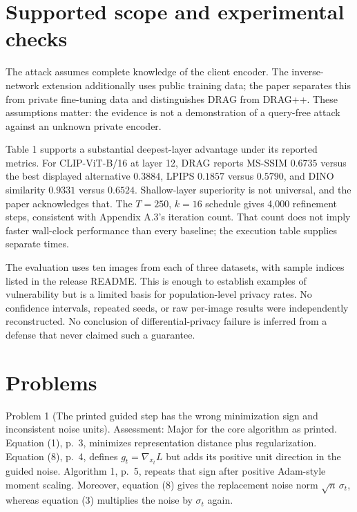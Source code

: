 \documentclass[10pt]{article}
\begin{document}
\section*{Supported scope and experimental checks}
The attack assumes complete knowledge of the client encoder. The inverse-network extension additionally uses public training data; the paper separates this from private fine-tuning data and distinguishes DRAG from DRAG++. These assumptions matter: the evidence is not a demonstration of a query-free attack against an unknown private encoder.\par
Table 1 supports a substantial deepest-layer advantage under its reported metrics. For CLIP-ViT-B/16 at layer 12, DRAG reports MS-SSIM \(0.6735\) versus the best displayed alternative \(0.3884\), LPIPS \(0.1857\) versus \(0.5790\), and DINO similarity \(0.9331\) versus \(0.6524\). Shallow-layer superiority is not universal, and the paper acknowledges that. The \(T=250\), \(k=16\) schedule gives 4,000 refinement steps, consistent with Appendix A.3’s iteration count. That count does not imply faster wall-clock performance than every baseline; the execution table supplies separate times.\par
The evaluation uses ten images from each of three datasets, with sample indices listed in the release README. This is enough to establish examples of vulnerability but is a limited basis for population-level privacy rates. No confidence intervals, repeated seeds, or raw per-image results were independently reconstructed. No conclusion of differential-privacy failure is inferred from a defense that never claimed such a guarantee.\par
\section*{Problems}
Problem 1 (The printed guided step has the wrong minimization sign and inconsistent noise units).  Assessment: Major for the core algorithm as printed. Equation (1), p. 3, minimizes representation distance plus regularization. Equation (8), p. 4, defines \(g_t=\nabla_{x_t}L\) but adds its positive unit direction in the guided noise. Algorithm 1, p. 5, repeats that sign after positive Adam-style moment scaling. Moreover, equation (8) gives the replacement noise norm \(\sqrt n\,\sigma_t\), whereas equation (3) multiplies the noise by \(\sigma_t\) again.\par
\end{document}
